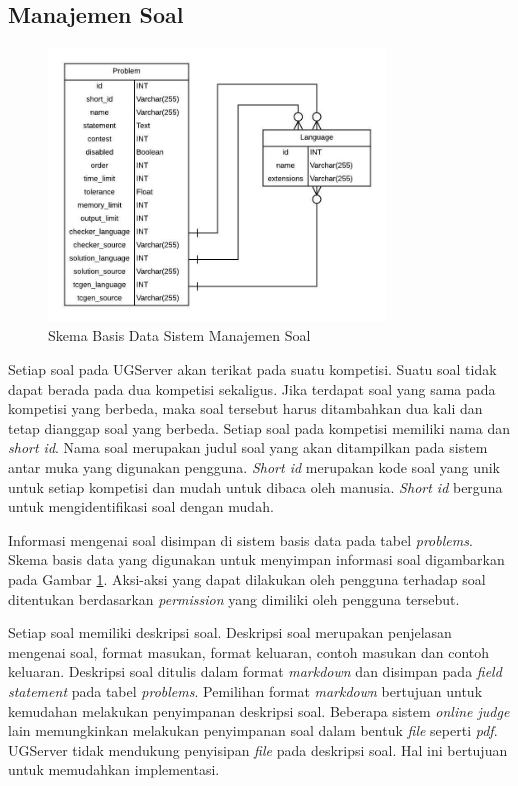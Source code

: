 
\subsection{Manajemen Soal}

\begin{figure}[ht!]
    \centering
    \includegraphics[width=0.8\textwidth]{images/problem-schema}
    \caption{Skema Basis Data Sistem Manajemen Soal}
    \label{fig:problem-schema}
\end{figure}

\par Setiap soal pada UGServer akan terikat pada suatu kompetisi. Suatu soal tidak dapat berada pada dua kompetisi sekaligus. Jika terdapat soal yang sama pada kompetisi yang berbeda, maka soal tersebut harus ditambahkan dua kali dan tetap dianggap soal yang berbeda. Setiap soal pada kompetisi memiliki nama dan \textit{short id}. Nama soal merupakan judul soal yang akan ditampilkan pada sistem antar muka yang digunakan pengguna. \textit{Short id} merupakan kode soal yang unik untuk setiap kompetisi dan mudah untuk dibaca oleh manusia. \textit{Short id} berguna untuk mengidentifikasi soal dengan mudah.

\par Informasi mengenai soal disimpan di sistem basis data pada tabel \textit{problems}. Skema basis data yang digunakan untuk menyimpan informasi soal digambarkan pada Gambar \ref{fig:problem-schema}. Aksi-aksi yang dapat dilakukan oleh pengguna terhadap soal ditentukan berdasarkan \textit{permission} yang dimiliki oleh pengguna tersebut.


\par Setiap soal memiliki deskripsi soal. Deskripsi soal merupakan penjelasan mengenai soal, format masukan, format keluaran, contoh masukan dan contoh keluaran. Deskripsi soal ditulis dalam format \textit{markdown} dan disimpan pada \textit{field} \textit{statement} pada tabel \textit{problems}. Pemilihan format \textit{markdown} bertujuan untuk kemudahan melakukan penyimpanan deskripsi soal. Beberapa sistem \textit{online judge} lain memungkinkan melakukan penyimpanan soal dalam bentuk \textit{file} seperti \textit{pdf}. UGServer tidak mendukung penyisipan \textit{file} pada deskripsi soal. Hal ini bertujuan untuk memudahkan implementasi.

